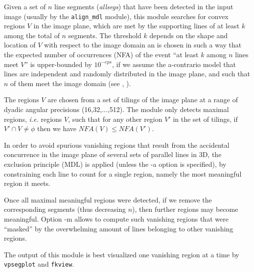Given a set of $n$ line segments (\emph{allsegs}) that have been detected in the input image (usually by the \verb+align_mdl+ module), this module searches for convex regions $V$ in the image plane, which are met by the supporting lines of at least $k$ among the total of $n$ segments. The threshold $k$ depends on the shape and location of $V$ with respect to the image domain an is chosen in such a way that the expected number of occurrences (NFA) of the event ``at least $k$ among $n$ lines meet $V$'' is upper-bounded by $10^{-eps}$, if we assume the a-contrario model that lines are independent and randomly distributed in the image plane, and such that $n$ of them meet the image domain (see \cite{almansa.desolneux.vamech:vanish}, \cite{almansa:phd}).

The regions $V$ are chosen from a set of tilings of the image plane at a range of dyadic angular precisions (16,32,...,512). The module only detects maximal regions, \emph{i.e.} regions $V$, such that for any other region $V'$ in the set of tilings, if $V'\cap V \neq \phi$ then we have $NFA(V)\leq NFA(V')$.

In order to avoid spurious vanishing regions that result from the accidental concurrence in the image plane of several sets of parallel lines in 3D, the exclusion principle (MDL) is applied (unless the -a option is specified), by constraining each line to count for a single region, namely the most meaningful region it meets.

Once all maximal meaningful regions were detected, if we remove the corresponding segments (thus decreasing $n$), then further regions may become meaningful. Option -m allows to compute such vanishing regions that were ``masked'' by the overwhelming amount of lines belonging to other vanishing regions.

The output of this module is best visualized one vanishing region at a time by \verb+vpsegplot+ and \verb+fkview+.

